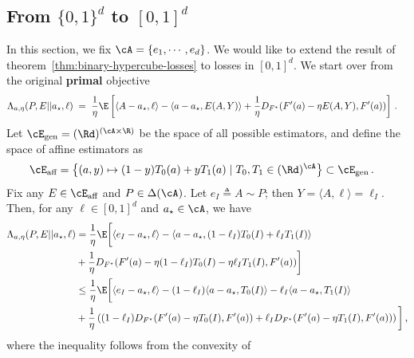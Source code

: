 \subsection{From \texorpdfstring{$\{0,1\}^d$}{\{0,1\}\^{}d} to \texorpdfstring{$[0,1]^d$}{[0,1]\^{}d}}
In this section, we fix $\cA = \{e_1, \cdots, e_d\}$.
We would like to extend the result of theorem~\ref{thm:binary-hypercube-losses}
to losses in $[0,1]^d$.
We start over from the original \textbf{primal} objective
\begin{align*}
    \Lambda_{a, \eta}(P, E || a_\star, \ell)
     & \;=\;
    \frac{1}{\eta}
    \E\left[
        \langle A - a_\star, \ell\rangle
        - \langle a - a_\star, E(A, Y)\rangle
        + \frac{1}{\eta} D_{F^\star}(F'(a) - \eta E(A, Y), F'(a))
        \right]\,.
\end{align*}
Let $\cE_{\text{gen}} = (\Rd)^{(\cA \times \R)}$ be the space of
all possible estimators, and define the space of affine estimators as
\begin{align*}
    \cE_{\text{aff}} & =
    \left\{
    (a, y) \mapsto (1-y) T_0(a) + y T_1(a)
    \mid
    T_0, T_1 \in (\Rd)^\cA
    \right\}
    \subset \cE_{\text{gen}}
    \,.
\end{align*}
Fix any $E \in \cE_{\text{aff}}$ and $P \in \Delta(\cA)$.
Let $e_I\triangleq A \sim P$; then $Y = \langle A, \ell \rangle = \ell_I$.
Then, for any $\ell \in [0,1]^d$ and $a_\star \in \cA$, we have
\begin{align*}
    \Lambda_{a, \eta}(P, E || a_\star, \ell)
     & =
    \frac{1}{\eta}
    \E\bigg[
        \langle e_I - a_\star, \ell\rangle
    - \langle a - a_\star, (1-\ell_I)T_0(I) + \ell_I T_1(I)\rangle                               \\
     & + \frac{1}{\eta} D_{F^\star}(F'(a) - \eta (1 - \ell_I)T_0(I) - \eta \ell_I T_1(I), F'(a))
    \bigg]                                                                                       \\
     & \leq
    \frac{1}{\eta}
    \E\bigg[
        \langle e_I - a_\star, \ell\rangle
        - (1-\ell_I)\langle a - a_\star, T_0(I)\rangle
    - \ell_I \langle a - a_\star, T_1(I)\rangle                                                  \\
     & + \frac{1}{\eta}
        \left(
        (1 - \ell_I) D_{F^\star}(F'(a) - \eta T_0(I), F'(a))
        +
        \ell_I D_{F^\star}(F'(a) - \eta T_1(I), F'(a))
        \right)
        \bigg]\,,
\end{align*}
where the inequality follows from the convexity of
